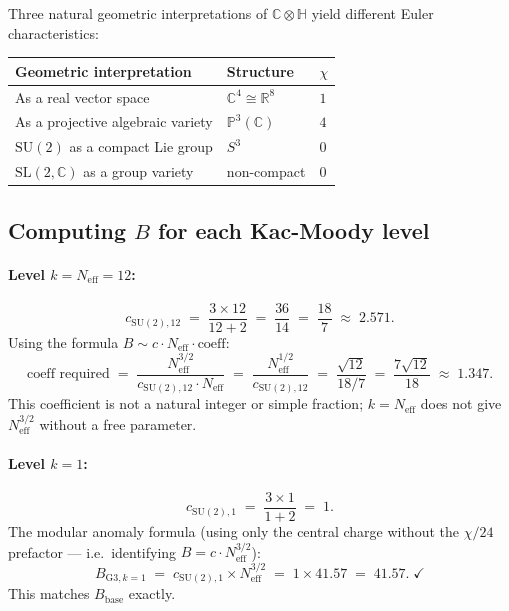 \documentclass[11pt,a4paper]{article}
\theoremstyle{definition}
\theoremstyle{remark}
\begin{document}
Three natural geometric interpretations of $\mathbb{C}\otimes\mathbb{H}$
yield different Euler characteristics:

\begin{center}
\begin{tabular}{lll}
  \toprule
  Geometric interpretation & Structure & $\chi$ \\
  \midrule
  As a real vector space & $\mathbb{C}^4 \cong \mathbb{R}^8$ & $1$ \\
  As a projective algebraic variety & $\mathbb{P}^3(\mathbb{C})$ & $4$ \\
  $\mathrm{SU}(2)$ as a compact Lie group & $S^3$ & $0$ \\
  $\mathrm{SL}(2,\mathbb{C})$ as a group variety & non-compact & $0$ \\
  \bottomrule
\end{tabular}
\end{center}

\subsection{Computing $B$ for each Kac-Moody level}

\paragraph{Level $k = N_{\mathrm{eff}} = 12$:}
\begin{equation}
  c_{\mathrm{SU}(2),12}
  \;=\; \frac{3 \times 12}{12 + 2}
  \;=\; \frac{36}{14}
  \;=\; \frac{18}{7}
  \;\approx\; 2.571.
  \label{eq:c_k12}
\end{equation}
Using the formula $B \sim c \cdot N_{\mathrm{eff}} \cdot \text{coeff}$:
\begin{equation}
  \text{coeff required}
  \;=\; \frac{N_{\mathrm{eff}}^{3/2}}{c_{\mathrm{SU}(2),12} \cdot N_{\mathrm{eff}}}
  \;=\; \frac{N_{\mathrm{eff}}^{1/2}}{c_{\mathrm{SU}(2),12}}
  \;=\; \frac{\sqrt{12}}{18/7}
  \;=\; \frac{7\sqrt{12}}{18}
  \;\approx\; 1.347.
  \label{eq:coeff_k12}
\end{equation}
This coefficient is not a natural integer or simple fraction;
$k = N_{\mathrm{eff}}$ does not give $N_{\mathrm{eff}}^{3/2}$ without
a free parameter.

\paragraph{Level $k = 1$:}
\begin{equation}
  c_{\mathrm{SU}(2),1}
  \;=\; \frac{3 \times 1}{1 + 2}
  \;=\; 1.
  \label{eq:c_k1}
\end{equation}
The modular anomaly formula (using only the central charge without the
$\chi/24$ prefactor — i.e.\ identifying $B = c \cdot N_{\mathrm{eff}}^{3/2}$):
\begin{equation}
  B_{\mathrm{G3},k=1}
  \;=\; c_{\mathrm{SU}(2),1} \times N_{\mathrm{eff}}^{3/2}
  \;=\; 1 \times 41.57
  \;=\; 41.57. \;\checkmark
  \label{eq:B_G3_k1_match}
\end{equation}
This matches $B_{\mathrm{base}}$ exactly.
\end{document}
